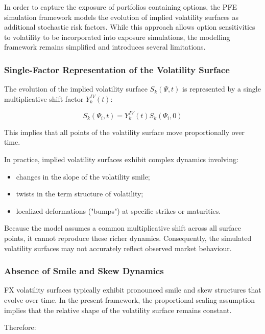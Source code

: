 In order to capture the exposure of portfolios containing options, the PFE simulation framework models the evolution of implied volatility surfaces as additional stochastic risk factors. While this approach allows option sensitivities to volatility to be incorporated into exposure simulations, the modelling framework remains simplified and introduces several limitations.

\subsubsection{Single-Factor Representation of the Volatility Surface}

The evolution of the implied volatility surface $S_k(\Psi,t)$ is represented by a single multiplicative shift factor $Y_k^{IV}(t)$:

\begin{equation}
	S_k(\Psi_i,t) = Y_k^{IV}(t) S_k(\Psi_i,0)
\end{equation}

This implies that all points of the volatility surface move proportionally over time.

In practice, implied volatility surfaces exhibit complex dynamics involving:

\begin{itemize}
	\item changes in the slope of the volatility smile;
	\item twists in the term structure of volatility;
	\item localized deformations ("bumps") at specific strikes or maturities.
\end{itemize}

Because the model assumes a common multiplicative shift across all surface points, it cannot reproduce these richer dynamics. Consequently, the simulated volatility surfaces may not accurately reflect observed market behaviour.

\subsubsection{Absence of Smile and Skew Dynamics}

FX volatility surfaces typically exhibit pronounced smile and skew structures that evolve over time. In the present framework, the proportional scaling assumption implies that the relative shape of the volatility surface remains constant.

Therefore:

